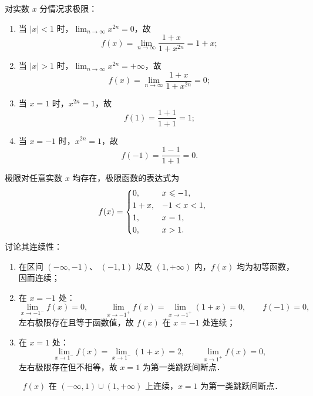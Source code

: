 \begin{solution}
    对实数 $x$ 分情况求极限：
    \begin{enumerate}
        \item 当 $|x| < 1$ 时，$\lim_{n\to\infty} x^{2n} = 0$，故
              \begin{equation}
                  f(x) = \lim_{n\to\infty} \frac{1+x}{1+x^{2n}} = 1 + x;
              \end{equation}
        \item 当 $|x| > 1$ 时，$\lim_{n\to\infty} x^{2n} = +\infty$，故
              \begin{equation}
                  f(x) = \lim_{n\to\infty} \frac{1+x}{1+x^{2n}} = 0;
              \end{equation}
        \item 当 $x = 1$ 时，$x^{2n} = 1$，故
              \begin{equation}
                  f(1) = \frac{1+1}{1+1} = 1;
              \end{equation}
        \item 当 $x = -1$ 时，$x^{2n} = 1$，故
              \begin{equation}
                  f(-1) = \frac{1-1}{1+1} = 0.
              \end{equation}
    \end{enumerate}
    极限对任意实数 $x$ 均存在，极限函数的表达式为
    \begin{equation}
        f(x) = \begin{dcases} 0, & x \leqslant -1, \\ 1+x, & -1 < x < 1, \\ 1, & x = 1, \\ 0, & x > 1. \end{dcases}
    \end{equation}
    讨论其连续性：
    \begin{enumerate}
        \item 在区间 $(-\infty, -1)$、 $(-1, 1)$ 以及 $(1, +\infty)$ 内，$f(x)$ 均为初等函数，因而连续；
        \item 在 $x = -1$ 处：
              \begin{equation}
                  \lim_{x\to -1^-} f(x) = 0, \qquad \lim_{x\to -1^+} f(x) = \lim_{x\to -1^+} (1+x) = 0, \qquad f(-1) = 0,
              \end{equation}
              左右极限存在且等于函数值，故 $f(x)$ 在 $x = -1$ 处连续；
        \item 在 $x = 1$ 处：
              \begin{equation}
                  \lim_{x\to 1^-} f(x) = \lim_{x\to 1^-} (1+x) = 2, \qquad \lim_{x\to 1^+} f(x) = 0,
              \end{equation}
              左右极限存在但不相等，故 $x = 1$ 为第一类跳跃间断点．
    \end{enumerate}
    \begin{equation}
        \boxed{f(x) \text{ 在 } (-\infty, 1) \cup (1, +\infty) \text{ 上连续，} x = 1 \text{ 为第一类跳跃间断点．}}
    \end{equation}
\end{solution}


